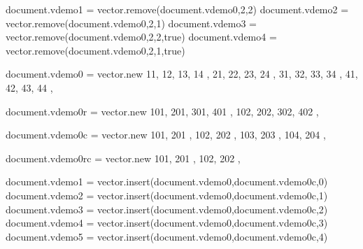 \startlinecorrection
{} {}
    {} {}
    {} {}
    {} {}
    {} {}
\stopcombination
\stoplinecorrection

\startbuffer
\startluacode
document.vdemo1 = vector.remove(document.vdemo0,2,2)
document.vdemo2 = vector.remove(document.vdemo0,2,1)
document.vdemo3 = vector.remove(document.vdemo0,2,2,true)
document.vdemo4 = vector.remove(document.vdemo0,2,1,true)
\stopluacode
\stopbuffer

\typebuffer[option=TEX] \getbuffer

\startlinecorrection
{} {}
    {} {}
    {} {}
    {} {}
    {} {}
\stopcombination
\stoplinecorrection

\startbuffer
\startluacode
document.vdemo0 = vector.new {
    { 11, 12, 13, 14 },
    { 21, 22, 23, 24 },
    { 31, 32, 33, 34 },
    { 41, 42, 43, 44 },
}

document.vdemo0r = vector.new {
    { 101, 201, 301, 401 },
    { 102, 202, 302, 402 },
}

document.vdemo0c = vector.new {
    { 101, 201 },
    { 102, 202 },
    { 103, 203 },
    { 104, 204 },
}

document.vdemo0rc = vector.new {
    { 101, 201 },
    { 102, 202 },
}
\stopluacode
\stopbuffer

\typebuffer[option=TEX] \getbuffer

\startlinecorrection
{}   {}
    {}  {}
    {}  {}
    {} {}
\stopcombination
\stoplinecorrection

\startbuffer
\startluacode
document.vdemo1 = vector.insert(document.vdemo0,document.vdemo0c,0)
document.vdemo2 = vector.insert(document.vdemo0,document.vdemo0c,1)
document.vdemo3 = vector.insert(document.vdemo0,document.vdemo0c,2)
document.vdemo4 = vector.insert(document.vdemo0,document.vdemo0c,3)
document.vdemo5 = vector.insert(document.vdemo0,document.vdemo0c,4)
\stopluacode
\stopbuffer

